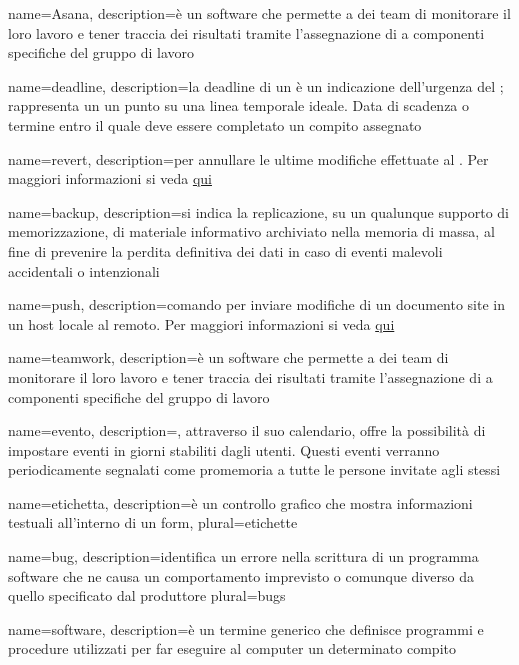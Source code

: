  {
	name=Asana,
	description={è un software che permette a dei team di monitorare il loro lavoro e tener traccia dei risultati tramite l'assegnazione di  a componenti specifiche del gruppo di lavoro}
}

 {
	name=deadline,
	description={la deadline di un  è un indicazione dell'urgenza del ; rappresenta un un punto su una linea temporale ideale. Data di scadenza o termine entro il quale deve essere completato un compito assegnato}
}

 {
	name=revert,
	description={per annullare le ultime modifiche effettuate al . Per maggiori informazioni si veda \href{https://git-scm.com/docs/}{qui}}
}

 {
	name=backup,
	description={si indica la replicazione, su un qualunque supporto di memorizzazione, di materiale informativo archiviato nella memoria di massa, al fine di prevenire la perdita definitiva dei dati in caso di eventi malevoli accidentali o intenzionali}
}

 {
	name=push,
	description={comando  per inviare modifiche di un documento site in un host locale al  remoto. Per maggiori informazioni si veda \href{https://git-scm.com/docs/}{qui}}
}

 {
	name=teamwork,
	description={è un software che permette a dei team di monitorare il loro lavoro e tener traccia dei risultati tramite l'assegnazione di  a componenti specifiche del gruppo di lavoro}
}

 {
	name=evento,
	description={, attraverso il suo calendario, offre la possibilità di impostare eventi in giorni stabiliti dagli utenti. Questi eventi verranno periodicamente segnalati come promemoria a tutte le persone invitate agli stessi}
}

 {
	name=etichetta,
	description={è un controllo grafico che mostra informazioni testuali all'interno di un form},
	plural=etichette
}

 {
	name=bug,
	description={identifica un errore nella scrittura di un programma software che ne causa un comportamento imprevisto o comunque diverso da quello specificato dal produttore}
	plural=bugs
}

 {
	name=software,
	description={è un termine generico che definisce programmi e procedure utilizzati per far eseguire al computer un determinato compito}
}

